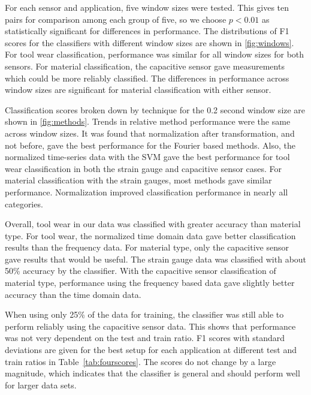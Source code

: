 For each sensor and application, five window sizes were tested. 
This gives ten pairs for comparison among each group of five, 
 so we choose $p<0.01$ as statistically significant for differences in performance.
The distributions of F1 scores for the classifiers with different window sizes are shown in \ref{fig:windows}.
For tool wear classification, performance was similar for all window sizes for both sensors.
For material classification, the capacitive sensor gave measurements which could be more reliably classified.
The differences in performance across window sizes are significant for material classification with either sensor.

Classification scores broken down by technique for the 0.2 second window size are shown in \ref{fig:methods}.
Trends in relative method performance were the same across window sizes.
It was found that normalization after transformation, and not before, gave the best performance for 
 the Fourier based methods.
Also, the normalized time-series data with the SVM gave the best performance for 
 tool wear classification in both the strain gauge and capacitive sensor cases.
For material classification with the strain gauges, most methods gave similar performance.
Normalization improved classification performance in nearly all categories.

Overall, tool wear in our data was classified with greater accuracy than material type. 
For tool wear, the normalized time domain data gave better classification results than
 the frequency data.
For material type, only the capacitive sensor gave results that would be useful. 
The strain gauge data was classified with about 50\% accuracy by the classifier.
With the capacitive sensor classification of material type, 
performance using the frequency based data gave slightly better accuracy than the time
domain data.

When using only 25\% of the data for training, the classifier was still able to perform
reliably using the capacitive sensor data. 
This shows that performance was not very dependent on the test and train ratio.
F1 scores with standard deviations are given for the best setup for each application 
 at different test and train ratios in Table~\ref{tab:fourscores}.
The scores do not change by a large magnitude, which indicates that 
 the classifier is general and should perform well for larger data sets.

